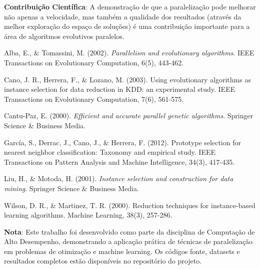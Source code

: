 \documentclass[12pt,a4paper]{article}
\begin{document}
\textbf{Contribuição Científica}: A demonstração de que a paralelização pode melhorar não apenas a velocidade, mas também a qualidade dos resultados (através da melhor exploração do espaço de soluções) é uma contribuição importante para a área de algoritmos evolutivos paralelos.

\begin{thebibliography}{9}

Alba, E., \& Tomassini, M. (2002). \textit{Parallelism and evolutionary algorithms}. IEEE Transactions on Evolutionary Computation, 6(5), 443-462.

Cano, J. R., Herrera, F., \& Lozano, M. (2003). Using evolutionary algorithms as instance selection for data reduction in KDD: an experimental study. IEEE Transactions on Evolutionary Computation, 7(6), 561-575.

Cantu-Paz, E. (2000). \textit{Efficient and accurate parallel genetic algorithms}. Springer Science \& Business Media.

García, S., Derrac, J., Cano, J., \& Herrera, F. (2012). Prototype selection for nearest neighbor classification: Taxonomy and empirical study. IEEE Transactions on Pattern Analysis and Machine Intelligence, 34(3), 417-435.

Liu, H., \& Motoda, H. (2001). \textit{Instance selection and construction for data mining}. Springer Science \& Business Media.

Wilson, D. R., \& Martinez, T. R. (2000). Reduction techniques for instance-based learning algorithms. Machine Learning, 38(3), 257-286.

\end{thebibliography}

\vspace{1cm}
\noindent\textbf{Nota}: Este trabalho foi desenvolvido como parte da disciplina de Computação de Alto Desempenho, demonstrando a aplicação prática de técnicas de paralelização em problemas de otimização e machine learning. Os códigos fonte, datasets e resultados completos estão disponíveis no repositório do projeto.
\end{document}
